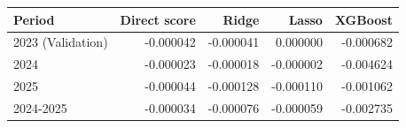 \begin{tabular}{lrrrr}
\toprule
Period & Direct score & Ridge & Lasso & XGBoost \\
\midrule
2023 (Validation) & -0.000042 & -0.000041 & 0.000000 & -0.000682 \\
2024 & -0.000023 & -0.000018 & -0.000002 & -0.004624 \\
2025 & -0.000044 & -0.000128 & -0.000110 & -0.001062 \\
2024-2025 & -0.000034 & -0.000076 & -0.000059 & -0.002735 \\
\bottomrule
\end{tabular}
